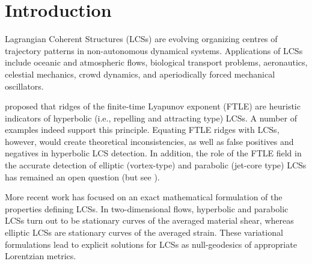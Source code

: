\documentclass[5p]{elsarticle}
\begin{document}
\section{Introduction}

\begin{sloppypar}
Lagrangian Coherent Structures (LCSs) are evolving organizing centres of trajectory patterns in non-autonomous dynamical systems\citep{haller00:_lagran,peacock13:_lagran,haller15:_langr_coher_struc}. Applications of LCSs include oceanic and atmospheric flows\citep{beron-vera13:_objec_agulh,koh02:_hyper}, biological transport problems\citep{wilson09:_lagran_reynol,tallapragada11:_lagran,huhn12:_south_indian_ocean_count_madag}, aeronautics\citep{tang10:_accur_lagran_hong_kong_inter_airpor}, celestial mechanics\citep{gawlik09:_lagran}, crowd dynamics\citep{ali07:_lagran_partic_dynam_approac_crowd}, and aperiodically forced mechanical oscillators\citep{hadjighasem13:_detec_kam}.
\end{sloppypar}

\citet{haller01:_distin} proposed that ridges of the finite-time Lyapunov exponent (FTLE) are heuristic indicators of hyperbolic (i.e., repelling and attracting type) LCSs. A number of examples indeed support this principle\citep{peacock13:_lagran}. Equating FTLE ridges with LCSs, however, would create theoretical inconsistencies, as well as false positives and negatives in hyperbolic LCS detection\citep{haller11:_lagran_coher_struc,norgard12:_secon_lagran_coher_struc}. In addition, the role of the FTLE field in the accurate detection of elliptic (vortex-type) and parabolic (jet-core type) LCSs has remained an open question (but see \citet{beron-vera10:_invar_lagran}).

More recent work has focused on an exact mathematical formulation of the properties defining LCSs\citep{haller11:_lagran_coher_struc,farazmand12:_comput_lagran,haller12:_geodes_theor_trans_barrier_two_dimen_flows,haller13:_coher_lagran,haller14:_adden_coher_lagran,farazmand13:_attrac_lagran,blazevski14:_hyper_ellip_trans_barrier_three}.
In two-dimensional flows, hyperbolic and parabolic LCSs turn out to be stationary curves of the averaged material shear\citep{farazmand14:_shearless}, whereas elliptic LCSs are stationary curves of the averaged strain\citep{haller13:_coher_lagran,haller14:_adden_coher_lagran}.
These variational formulations lead to explicit solutions for LCSs as null-geodesics of appropriate Lorentzian metrics.
\end{document}
